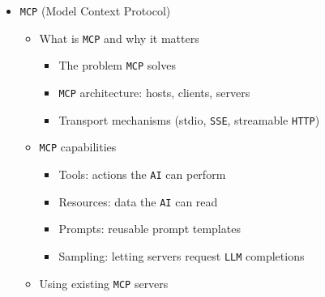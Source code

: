 \documentclass[
]{article}
\providecommand{\tightlist}{%
  \setlength{\itemsep}{0pt}\setlength{\parskip}{0pt}}
\begin{document}
\begin{itemize}
\begin{itemize}
    \begin{itemize}
    \tightlist
    \item
      \texttt{File} operations (read, write, edit, glob, \texttt{grep})
    \item
      Shell execution
    \item
      Web search and fetch
    \item
      LSP integration
    \end{itemize}
  \item
    Building custom tools

    \begin{itemize}
    \tightlist
    \item
      Tool definition formats
    \item
      Implementing tool handlers
    \item
      Testing tools with \texttt{AI} agents
    \item
      Versioning and maintaining tools
    \end{itemize}
  \end{itemize}
\item
  \texttt{MCP} (Model Context Protocol)

  \begin{itemize}
  \tightlist
  \item
    What is \texttt{MCP} and why it matters

    \begin{itemize}
    \tightlist
    \item
      The problem \texttt{MCP} solves
    \item
      \texttt{MCP} architecture: hosts, clients, servers
    \item
      Transport mechanisms (stdio, \texttt{SSE}, streamable
      \texttt{HTTP})
    \end{itemize}
  \item
    \texttt{MCP} capabilities

    \begin{itemize}
    \tightlist
    \item
      Tools: actions the \texttt{AI} can perform
    \item
      Resources: data the \texttt{AI} can read
    \item
      Prompts: reusable prompt templates
    \item
      Sampling: letting servers request \texttt{LLM} completions
    \end{itemize}
  \item
    Using existing \texttt{MCP} servers


\end{itemize}
\end{itemize}
\end{document}
